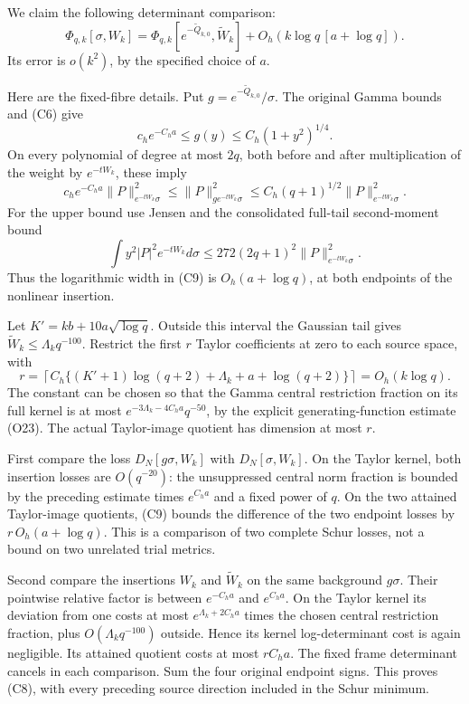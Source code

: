 \documentclass[11pt,a4paper]{article}
\begin{document}
We claim the following determinant comparison: \[
\boxed{\Phi_{q,k}[\sigma,W_k]
=\Phi_{q,k}[e^{-\widetilde Q_{k,0}},\widetilde W_k]
+O_h\!\left(k\log q\,[a+\log q]\right).}\tag{C8}
\] Its error is \(o(k^2)\), by the specified choice of \(a\).

Here are the fixed-fibre details. Put
\(g=e^{-\widetilde Q_{k,0}}/\sigma\). The original Gamma bounds and (C6)
give \[
c_he^{-C_ha}\le g(y)\le C_h(1+y^2)^{1/4}.
\] On every polynomial of degree at most \(2q\), both before and after
multiplication of the weight by \(e^{-tW_k}\), these imply \[
c_he^{-C_ha}\|P\|_{e^{-tW_k}\sigma}^2
\le\|P\|_{g e^{-tW_k}\sigma}^2
\le C_h(q+1)^{1/2}\|P\|_{e^{-tW_k}\sigma}^2.
\tag{C9}
\] For the upper bound use Jensen and the consolidated full-tail
second-moment bound \[
\int y^2|P|^2e^{-tW_k}d\sigma\le272(2q+1)^2\|P\|_{e^{-tW_k}\sigma}^2.
\] Thus the logarithmic width in (C9) is \(O_h(a+\log q)\), at both
endpoints of the nonlinear insertion.

Let \(K'=kb+10a\sqrt{\log q}\). Outside this interval the Gaussian tail
gives \(\widetilde W_k\le\Lambda_k q^{-100}\). Restrict the first \(r\)
Taylor coefficients at zero to each source space, with \[
r=\left\lceil C_h\{(K'+1)\log(q+2)+\Lambda_k+a+\log(q+2)\}\right\rceil
=O_h(k\log q).
\tag{C10}
\] The constant can be chosen so that the Gamma central restriction
fraction on its full kernel is at most \(e^{-3\Lambda_k-4C_ha}q^{-50}\),
by the explicit generating-function estimate (O23). The actual
Taylor-image quotient has dimension at most \(r\).

First compare the loss \(D_N[g\sigma,W_k]\) with \(D_N[\sigma,W_k]\). On
the Taylor kernel, both insertion losses are \(O(q^{-20})\): the
unsuppressed central norm fraction is bounded by the preceding estimate
times \(e^{C_ha}\) and a fixed power of \(q\). On the two attained
Taylor-image quotients, (C9) bounds the difference of the two endpoint
losses by \(r\,O_h(a+\log q)\). This is a comparison of two complete
Schur losses, not a bound on two unrelated trial metrics.

Second compare the insertions \(W_k\) and \(\widetilde W_k\) on the same
background \(g\sigma\). Their pointwise relative factor is between
\(e^{-C_ha}\) and \(e^{C_ha}\). On the Taylor kernel its deviation from
one costs at most \(e^{\Lambda_k+2C_ha}\) times the chosen central
restriction fraction, plus \(O(\Lambda_kq^{-100})\) outside. Hence its
kernel log-determinant cost is again negligible. Its attained quotient
costs at most \(rC_ha\). The fixed frame determinant cancels in each
comparison. Sum the four original endpoint signs. This proves (C8), with
every preceding source direction included in the Schur minimum.
\end{document}
